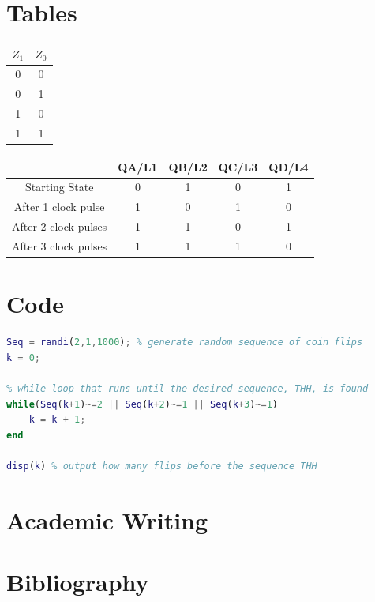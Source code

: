 \documentclass[11pt, a4paper]{article}
\begin{document}
\section{Tables}

\begin{table}[!ht]
    \centering
    \small
    \begin{tabular}{|c|c|}
        \hline 
        $Z_1$ & $Z_0$ \\ \hline
        0 & 0 \\ \hline
        0 & 1 \\ \hline
        1 & 0 \\ \hline
        1 & 1 \\ \hline
    \end{tabular}
    \label{Step (2) Table}
\end{table}


\begin{table}[!ht]
    \small
    \begin{tabular}{|c|c|c|c|c|}
        \hline 
         & QA/L1 & QB/L2 & QC/L3 & QD/L4 \\ \hline
        Starting State & 0 & 1 & 0 & 1 \\ \hline
        After 1 clock pulse & 1 & 0 & 1 & 0 \\ \hline
        After 2 clock pulses & 1 & 1 & 0 & 1 \\ \hline
        After 3 clock pulses & 1 & 1 & 1 & 0 \\ \hline
    \end{tabular}
    \label{Step (14) Table}
\end{table}




\section{Code}

\lstset{style=mainstyle}
\begin{lstlisting}[language=MATLAB]
Seq = randi(2,1,1000); % generate random sequence of coin flips
k = 0;

% while-loop that runs until the desired sequence, THH, is found
while(Seq(k+1)~=2 || Seq(k+2)~=1 || Seq(k+3)~=1)
    k = k + 1;
end

disp(k) % output how many flips before the sequence THH
\end{lstlisting}


\section{Academic Writing} %





\section{Bibliography}
\end{document}
